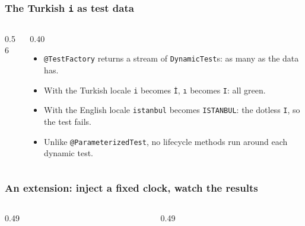 \documentclass[aspectratio=169,10pt,compress]{beamer}
\begin{document}
\begin{frame}[t,fragile] \frametitle{The Turkish \texttt{i} as test data}
  \begin{columns}[T]
    \begin{column}{0.56\textwidth}
    \end{column}
    \begin{column}{0.40\textwidth}
      \begin{itemize}\small
        \item \texttt{@TestFactory} returns a stream of \texttt{DynamicTest}s: as many as the data has.
        \item With the Turkish locale \texttt{i} becomes \texttt{İ}, \texttt{ı} becomes \texttt{I}: all green.
        \item With the English locale \texttt{istanbul} becomes \texttt{ISTANBUL}: the dotless \texttt{I}, so the test fails.
        \item Unlike \texttt{@ParameterizedTest}, no lifecycle methods run around each dynamic test.
      \end{itemize}
    \end{column}
  \end{columns}
\end{frame}





\begin{frame}[t,fragile] \frametitle{An extension: inject a fixed clock, watch the results}
  \begin{columns}[T]
    \begin{column}{0.49\textwidth}
    \end{column}
    \begin{column}{0.49\textwidth}
    \end{column}
  \end{columns}
\end{frame}
\end{document}
